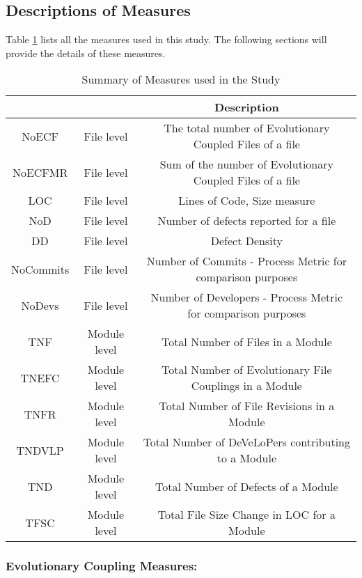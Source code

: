 \documentclass[times]{smrauth}
\begin{document}
\subsection{Descriptions of Measures}

Table \ref{SummaryofMeasures} lists all the measures used in this study. The following sections will provide the details of these measures. 

\begin{table}[!h]
\caption{Summary of Measures used in the Study} 
\label {SummaryofMeasures} 
\begin{center}
\begin{tabular}{ |c|c|c| }
  \hline
  &  & Description \\
  \hline
  NoECF & File level & The total number of Evolutionary Coupled Files of a file \\
  NoECFMR & File level & Sum of the number of Evolutionary Coupled Files of a file  \\
  LOC & File level & Lines of Code, Size measure \\
  NoD & File level & Number of defects reported for a file \\
  DD & File level & Defect Density \\
NoCommits & File level &  Number of Commits - Process Metric for comparison purposes\\
NoDevs & File level & Number of Developers - Process Metric for comparison purposes\\
  
  
  TNF & Module level & Total Number of Files in a Module \\
  TNEFC & Module level & Total Number of Evolutionary File Couplings in a Module \\
  TNFR & Module level & Total Number of File Revisions in a Module \\
  TNDVLP & Module level & Total Number of DeVeLoPers contributing to a Module \\
  TND & Module level & Total Number of Defects of a Module \\
  TFSC & Module level & Total File Size Change in LOC for a Module\\
  \hline
\end{tabular}
\end{center}
\end{table}

\subsubsection{Evolutionary Coupling Measures:}
\end{document}
